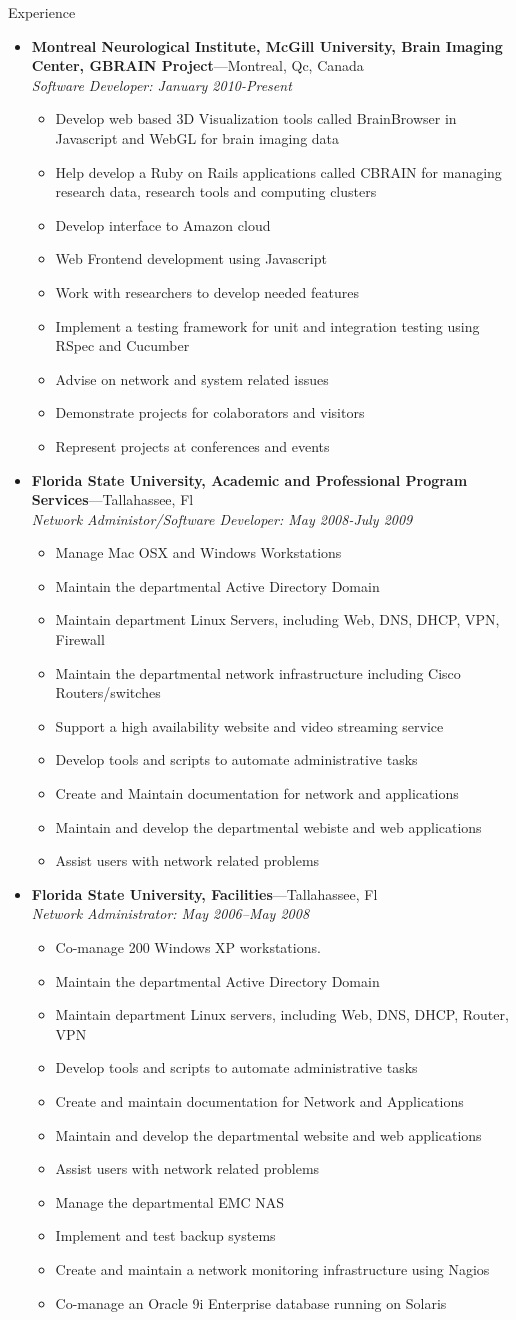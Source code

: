 \documentclass[11pt,oneside]{article}
\newenvironment{ressection}[1]{
	\vspace{4pt}
	{\fontfamily{phv}\selectfont\Large#1}
	\begin{itemize}
	\vspace{3pt}
}{
	\end{itemize}
}
\newcommand{\ressubitem}[1]{
	\vspace{-1pt}
	\item \begin{flushleft} #1 \end{flushleft}
}
\newcommand{\resbigitem}[3]{
	\vspace{-5pt}
	\item
	\textbf{#1}---#2 \\
	\textit{#3}
}
\newenvironment{ressubsec}[3]{
	\resbigitem{#1}{#2}{#3}
	\vspace{-2pt}
	\begin{itemize}
}{
	\end{itemize}
}
\begin{document}
\begin{ressection}{Experience}
  
    \begin{ressubsec}{Montreal Neurological Institute, McGill University, Brain Imaging Center, GBRAIN Project}{Montreal, Qc, Canada}{Software Developer: January 2010-Present}
      \ressubitem {Develop web based 3D Visualization tools called BrainBrowser in Javascript and WebGL for brain imaging data}
      \ressubitem {Help develop a  Ruby on Rails applications called CBRAIN for managing research data, research tools and computing clusters}
      \ressubitem {Develop interface to Amazon cloud}
      \ressubitem {Web Frontend development using Javascript} 
      \ressubitem {Work with researchers to develop needed features}
      \ressubitem {Implement a testing framework for unit and integration testing using RSpec and Cucumber}
      \ressubitem {Advise on network and system related issues}
      \ressubitem {Demonstrate projects for colaborators and visitors}
      \ressubitem {Represent projects at conferences and events}
    \end{ressubsec}

  \begin{ressubsec}{Florida State University, Academic and Professional Program Services}{Tallahassee, Fl}{Network Administor/Software Developer: May 2008-July 2009}
    \ressubitem{Manage Mac OSX and Windows Workstations}
    \ressubitem{Maintain the departmental Active Directory Domain}
    \ressubitem{Maintain department Linux Servers, including Web, DNS, DHCP, VPN, Firewall}
    \ressubitem{Maintain the departmental network infrastructure including Cisco Routers/switches}
    \ressubitem{Support a high availability website and video streaming service}
    \ressubitem{Develop tools and scripts to automate administrative tasks}
    \ressubitem{Create and Maintain documentation for network and applications}
    \ressubitem{Maintain and develop the departmental webiste and web applications}
    \ressubitem{Assist users with network related problems}
  \end{ressubsec}

	\begin{ressubsec}{Florida State University, Facilities}{Tallahassee, Fl}
{Network Administrator: May 2006--May 2008}
	  \ressubitem{Co-manage 200  Windows XP workstations.}
	  \ressubitem{Maintain the departmental Active Directory Domain}
          \ressubitem{Maintain department Linux servers, including Web, DNS, DHCP, Router, VPN}
	  \ressubitem{Develop tools and scripts to automate administrative tasks}
	  \ressubitem{Create and maintain documentation for Network and Applications}
	  \ressubitem{Maintain and develop the departmental website and web applications}
	  \ressubitem{Assist users with network related problems}
	  \ressubitem{Manage the departmental EMC NAS}
	  \ressubitem{Implement and test backup systems} 
	  \ressubitem{Create and maintain a network monitoring infrastructure using Nagios}
          \ressubitem{Co-manage an Oracle 9i Enterprise database running on Solaris}
	\end{ressubsec}
\end{ressection}
\end{document}
